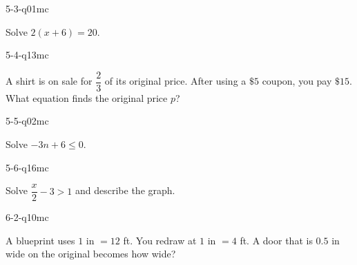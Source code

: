 \begin{practiceQuestion}{5-3-q01}{mc}
\begin{questionText}
Solve $2(x + 6) = 20$.
\end{questionText}
\end{practiceQuestion}

\begin{practiceQuestion}{5-4-q13}{mc}
\begin{questionText}
A shirt is on sale for $\dfrac{2}{3}$ of its original price. After using a $\$5$ coupon, you pay $\$15$. What equation finds the original price $p$?
\end{questionText}
\end{practiceQuestion}

\begin{practiceQuestion}{5-5-q02}{mc}
\begin{questionText}
Solve $-3n + 6 \leq 0$.
\end{questionText}
\end{practiceQuestion}

\begin{practiceQuestion}{5-6-q16}{mc}
\begin{questionText}
Solve $\dfrac{x}{2} - 3 > 1$ and describe the graph.
\end{questionText}
\end{practiceQuestion}

\begin{practiceQuestion}{6-2-q10}{mc}
\begin{questionText}
A blueprint uses $1$ in $= 12$ ft. You redraw at $1$ in $= 4$ ft. A door that is $0.5$ in wide on the original becomes how wide?
\end{questionText}
\end{practiceQuestion}

